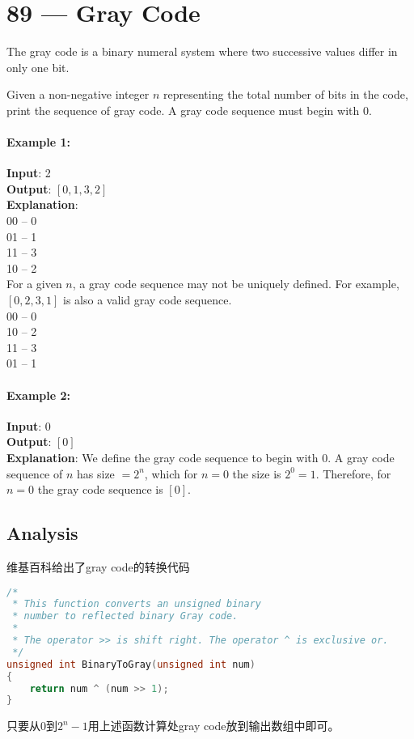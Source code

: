 \section{89 --- Gray Code}
The gray code is a binary numeral system where two successive values differ in only one bit.
\par
Given a non-negative integer $n$ representing the total number of bits in the code, print the sequence of gray code. A gray code sequence must begin with 0.
\paragraph{Example 1:}
\begin{flushleft}
\textbf{Input}: 2
\\
\textbf{Output}: $[0,1,3,2]$
\\
\textbf{Explanation}:
\\
00 -- 0
\\
01 -- 1
\\
11 -- 3
\\
10 -- 2
\\
For a given $n$, a gray code sequence may not be uniquely defined. For example, $[0,2,3,1]$ is also a valid gray code sequence.
\\
00 -- 0
\\
10 -- 2
\\
11 -- 3
\\
01 -- 1
\end{flushleft}
\paragraph{Example 2:}
\begin{flushleft}
\textbf{Input}: 0
\\
\textbf{Output}: $[0]$
\\
\textbf{Explanation}: We define the gray code sequence to begin with 0. A gray code sequence of $n$ has size $= 2^n$, which for $n = 0$ the size is $2^0 = 1$. Therefore, for $n = 0$ the gray code sequence is $[0]$.
\end{flushleft}
\subsection{Analysis}
\begin{CJK*}{UTF8}{gbsn}
维基百科给出了gray code的转换代码
\end{CJK*}
\begin{lstlisting}[backgroundcolor=\color{blue!80!green!10}, keywordstyle=\bfseries\color{green!40!black}, commentstyle=\itshape\color{purple!40!black},language=C++]
/*
 * This function converts an unsigned binary
 * number to reflected binary Gray code.
 *
 * The operator >> is shift right. The operator ^ is exclusive or.
 */
unsigned int BinaryToGray(unsigned int num)
{
    return num ^ (num >> 1);
}
\end{lstlisting}
\begin{CJK*}{UTF8}{gbsn}
只要从0到$2^n-1$用上述函数计算处gray code放到输出数组中即可。
\end{CJK*}